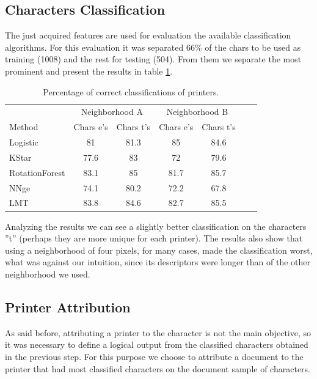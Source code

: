 \documentclass[10pt,twocolumn,letterpaper]{article}
\begin{document}
\subsection{Characters Classification}

The just acquired features are used for evaluation the available classification algorithms. For this evaluation it was separated 66\% of the chars to be used as training (1008) and the rest for testing (504). From them we separate the most prominent and present the results in table \ref{tab:correct_classification}.

\begin{table}
\caption{Percentage of correct classifications of printers.}
\label{tab:correct_classification}
\begin{center}
\begin{small} 
\setlength{\tabcolsep}{3pt} 
\begin{tabular}{l*{5}{c}r} & \multicolumn{2}{c}{Neighborhood A} & \multicolumn{2}{c}{Neighborhood B}\\ \cline{1-5}
Method & Chars e’s & Chars t’s & Chars e’s & Chars t’s \\
\hline
Logistic & 81 & 81.3 & 85 & 84.6\\
KStar & 77.6 & 83 & 72 & 79.6\\
RotationForest & 83.1 & 85 & 81.7 & 85.7\\
NNge & 74.1 & 80.2 & 72.2 & 67.8\\
LMT & 83.8 & 84.6 & 82.7 & 85.5\\

\end{tabular}
\end{small}
\end{center}
\end{table}

Analyzing the results we can see a slightly better classification on the characters ''t'' (perhaps they are more unique for each printer). The results also show that using a neighborhood of four pixels, for many cases, made the classification worst, what was against our intuition, since its descriptors were longer than of the other neighborhood we used.

\subsection{Printer Attribution}

As said before, attributing a printer to the character is not the main objective, so it was necessary to define a logical output from the classified characters obtained in the previous step. For this purpose we choose to attribute a document to the printer that had most classified characters on the document sample of characters.
\end{document}
